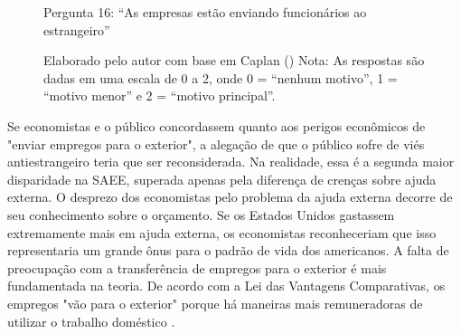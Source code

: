 \begin{figure}[H]
    \centering
    \caption*{Pergunta 16: “As empresas estão enviando funcionários ao estrangeiro”}
    \caption{Elaborado pelo autor com base em Caplan (\citeyear{The_Myth_of_the_Rational_Voter}) \newline
    Nota: As respostas são dadas em uma escala de 0 a 2, onde 0 = “nenhum motivo”, 1 = “motivo menor” e 2 = “motivo principal”.}
    \label{fig:pergunta_16}
\end{figure}

Se economistas e o público concordassem quanto aos perigos econômicos de "enviar empregos para o exterior", a alegação de que o público sofre de viés antiestrangeiro teria que ser reconsiderada. Na realidade, essa é a segunda maior disparidade na SAEE, superada apenas pela diferença de crenças sobre ajuda externa. O desprezo dos economistas pelo problema da ajuda externa decorre de seu conhecimento sobre o orçamento. Se os Estados Unidos gastassem extremamente mais em ajuda externa, os economistas reconheceriam que isso representaria um grande ônus para o padrão de vida dos americanos. A falta de preocupação com a transferência de empregos para o exterior é mais fundamentada na teoria. De acordo com a Lei das Vantagens Comparativas, os empregos "vão para o exterior" porque há maneiras mais remuneradoras de utilizar o trabalho doméstico \cite{krugman2015accidental,blinder1987hard}.



